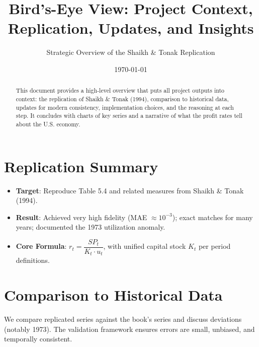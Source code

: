 \documentclass[12pt,a4paper]{article}
\title{Bird's-Eye View: Project Context, Replication, Updates, and Insights}
\author{Strategic Overview of the Shaikh \& Tonak Replication}
\date{\today}
\begin{document}
\maketitle

\begin{abstract}
This document provides a high-level overview that puts all project outputs into context: the replication of Shaikh \& Tonak (1994), comparison to historical data, updates for modern consistency, implementation choices, and the reasoning at each step. It concludes with charts of key series and a narrative of what the profit rates tell about the U.S. economy.
\end{abstract}

\tableofcontents
\newpage

\section{Replication Summary}
\begin{itemize}[leftmargin=1.2em]
    \item \textbf{Target}: Reproduce Table 5.4 and related measures from Shaikh \& Tonak (1994).
    \item \textbf{Result}: Achieved very high fidelity (MAE \(\approx 10^{-3}\)); exact matches for many years; documented the 1973 utilization anomaly.
    \item \textbf{Core Formula}: \( r_t = \dfrac{SP_t}{K_t \cdot u_t} \), with unified capital stock \(K_t\) per period definitions.
\end{itemize}

\section{Comparison to Historical Data}
We compare replicated series against the book's series and discuss deviations (notably 1973). The validation framework ensures errors are small, unbiased, and temporally consistent.
\end{document}

